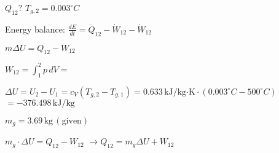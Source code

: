 \( Q_{12}? \)  
\( T_{g,2} = 0.003^\circ C \)  

Energy balance:  
\( \frac{dE}{dt} = \dot{Q}_{12} - \dot{W}_{12} - \dot{W}_{12} \)  

\( m \Delta U = Q_{12} - W_{12} \)  

\( W_{12} = \int_{1}^{2} p \, dV = \)  

\( \Delta U = U_{2} - U_{1} = c_{V} (T_{g,2} - T_{g,1}) = 0.633 \, \text{kJ/kg·K} \cdot (0.003^\circ C - 500^\circ C) \)  
\( = -376.498 \, \text{kJ/kg} \)  

\( m_{g} = 3.69 \, \text{kg} \, (\text{given}) \)  

\( m_{g} \cdot \Delta U = Q_{12} - W_{12} \)  
\( \rightarrow Q_{12} = m_{g} \Delta U + W_{12} \)